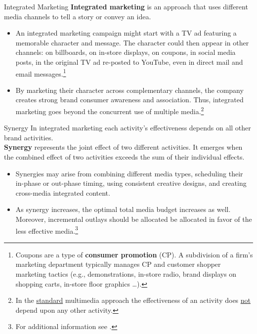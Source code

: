 \documentclass[pdf]{beamer}
\newcommand{\empr}[1]{{\color{franklinblue}\textbf{#1}}}
\theoremstyle{remark}
\theoremstyle{definition}
\begin{document}
\begin{frame}[t]{Integrated Marketing}
\empr{Integrated marketing} is an approach that uses different media channels to tell a story or convey an idea. \\
\vspace{0.0ex}
\small
\begin{itemize}
\item An integrated marketing campaign might start with a TV ad featuring a memorable character and message. The character could then appear in other channels: on billboards, on in-store displays, on coupons, in social media posts, in the original TV ad re-posted to YouTube, even in direct mail and email messages.\footnote{Coupons are a type of \empr{consumer promotion} (CP). A subdivision of a firm's marketing department typically manages CP and customer shopper marketing tactics (e.g., demonstrations, in-store radio, brand displays on shopping carts, in-store floor graphics \ldots).} 
\item By marketing their character across complementary channels, the company creates strong brand consumer awareness and association.  Thus, integrated marketing goes beyond the concurrent use of multiple media.\footnote{In the \underline{standard} multimedia approach the effectiveness of an activity does \underline{not} depend upon any other activity.}
\end{itemize} 
\end{frame}

\begin{frame}[t]{Synergy}
In integrated marketing each activity's effectiveness depends on all other brand activities. \\
\vspace{1.5ex}
\empr{Synergy} represents the joint effect of two different activities. It emerges when the combined effect of two activities exceeds the sum of their individual effects.\\
\vspace{1.5ex}
\begin{itemize}
\item Synergies may arise from combining different media types, scheduling their in-phase or out-phase timing, using consistent creative designs, and creating cross-media integrated content. 
\item As synergy increases, the optimal total media budget increases as well.  Moreover, incremental outlays should be allocated be allocated in favor of the less effective media.\footnote{For additional information see \cite{naik2003}. }
\end{itemize}
\end{frame}
\end{document}
